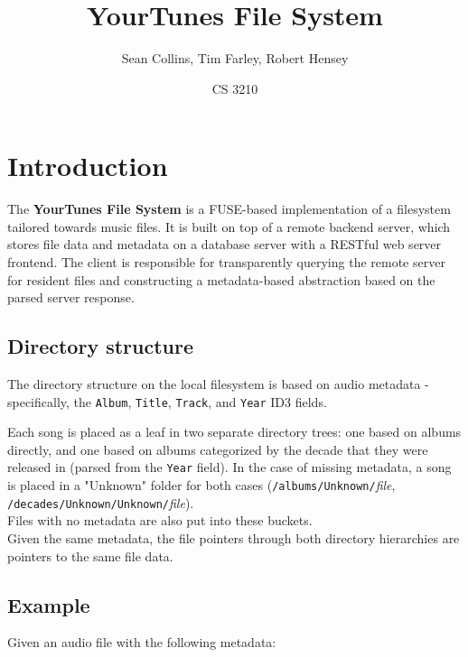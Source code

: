 \documentclass{article}
\title{YourTunes File System}
\date{CS 3210}
\author{Sean Collins, Tim Farley, Robert Hensey}
\begin{document}
	\maketitle
	\section{Introduction}
	The \textbf{YourTunes File System} is a FUSE-based implementation of a filesystem tailored towards music files. It is built on top of a remote backend server, which stores file data and metadata on a database server with a RESTful web server frontend. The client is responsible for transparently querying the remote server for resident files and constructing a metadata-based abstraction based on the parsed server response.
	
	\subsection{Directory structure}
	The directory structure on the local filesystem is based on audio metadata - specifically, the \texttt{Album}, \texttt{Title}, \texttt{Track}, and \texttt{Year} ID3 fields. 
	
	\vspace{0.01\textheight}
	
	\begin{figure}
		\centering
		
	\end{figure}
	
	\noindent Each song is placed as a leaf in two separate directory trees: one based on albums directly, and one based on albums categorized by the decade that they were released in (parsed from the \texttt{Year} field). In the case of missing metadata, a song is placed in a "Unknown" folder for both cases (\texttt{/albums/Unknown/}\textit{file}, \texttt{/decades/Unknown/Unknown/}\textit{file}). \\ Files with no metadata are also put into these buckets. \\
	
	\noindent Given the same metadata, the file pointers through both directory hierarchies are pointers to the same file data. 
	
	\pagebreak \restoregeometry
	
	\subsection{Example}
	Given an audio file with the following metadata: \\
	
\end{document}
